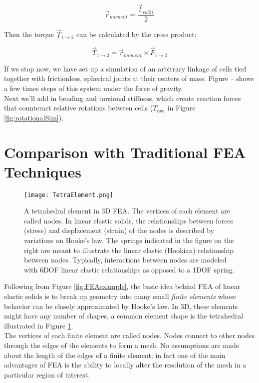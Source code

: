 {\[ \vec{r}_{moment} = \dfrac{\vec{l}_{rot21}}{2}\]

Then the torque $\vec{T}_{1\rightarrow2}$ can be calculated by the cross product:

\[ \vec{T}_{1\rightarrow2} =  \vec{r}_{moment} \times \vec{F}_{1\rightarrow2}\]

If we stop now, we have set up a simulation of an arbitrary linkage of cells tied together with frictionless, spherical joints at their centers of mass.  Figure -- shows a few times steps of this system under the force of gravity.\\

Next we'll add in bending and torsional stiffness, which create reaction forces that counteract relative rotations between cells ($T_{rxn}$ in Figure \ref{fig:rotationalSim}).  \\

\section{Comparison with Traditional FEA Techniques}

\begin{figure}
  \texttt{[image: TetraElement.png]}
  \caption{A tetrahedral element in 3D FEA.  The vertices of each element are called nodes.  In linear elastic solids, the relationships between forces (stress) and displacement (strain) of the nodes is described by variations on Hooke's law.  The springs indicated in the figure on the right are meant to illustrate the linear elastic (Hookian) relationship between nodes.  Typically, interactions between nodes are modeled with 6DOF linear elastic relationships as opposed to a 1DOF spring.}
  \label{fig:TetraElement}
\end{figure}

Following from Figure \ref{fig:FEAexample}, the basic idea behind FEA of linear elastic solids is to break up geometry into many small \textit{finite elements} whose behavior can be closely approximated by Hooke's law.  In 3D, these elements might have any number of shapes, a common element shape is the tetrahedral illustrated in Figure \ref{fig:TetraElement}.\\

The vertices of each finite element are called nodes.  Nodes connect to other nodes through the edges of the elements to form a mesh.  No assumptions are made about the length of the edges of a finite element; in fact one of the main advantages of FEA is the ability to locally alter the resolution of the mesh in a particular region of interest.\\

}
